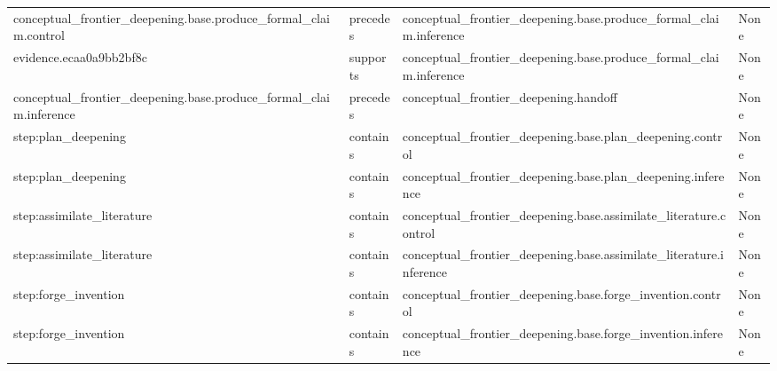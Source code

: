 \documentclass[10pt,a4paper]{article}
\begin{document}
\begin{longtable}{@{}>{\raggedright\arraybackslash}p{.24\linewidth}>{\raggedright\arraybackslash}p{.12\linewidth}>{\raggedright\arraybackslash}p{.24\linewidth}>{\raggedright\arraybackslash}p{.20\linewidth}@{}}
conceptual\allowbreak{}\_\allowbreak{}frontier\_\allowbreak{}deepening.\allowbreak{}base.\allowbreak{}produce\_\allowbreak{}formal\_\allowbreak{}claim.\allowbreak{}control & precedes & conceptual\allowbreak{}\_\allowbreak{}frontier\_\allowbreak{}deepening.\allowbreak{}base.\allowbreak{}produce\_\allowbreak{}formal\_\allowbreak{}claim.\allowbreak{}inference & None\\
evidence.\allowbreak{}ecaa0a9bb2\allowbreak{}bf8c & supports & conceptual\allowbreak{}\_\allowbreak{}frontier\_\allowbreak{}deepening.\allowbreak{}base.\allowbreak{}produce\_\allowbreak{}formal\_\allowbreak{}claim.\allowbreak{}inference & None\\
conceptual\allowbreak{}\_\allowbreak{}frontier\_\allowbreak{}deepening.\allowbreak{}base.\allowbreak{}produce\_\allowbreak{}formal\_\allowbreak{}claim.\allowbreak{}inference & precedes & conceptual\allowbreak{}\_\allowbreak{}frontier\_\allowbreak{}deepening.\allowbreak{}handoff & None\\
step:\allowbreak{}plan\_\allowbreak{}deepening & contains & conceptual\allowbreak{}\_\allowbreak{}frontier\_\allowbreak{}deepening.\allowbreak{}base.\allowbreak{}plan\_\allowbreak{}deepening.\allowbreak{}control & None\\
step:\allowbreak{}plan\_\allowbreak{}deepening & contains & conceptual\allowbreak{}\_\allowbreak{}frontier\_\allowbreak{}deepening.\allowbreak{}base.\allowbreak{}plan\_\allowbreak{}deepening.\allowbreak{}inference & None\\
step:\allowbreak{}assimilate\allowbreak{}\_\allowbreak{}literature\allowbreak{} & contains & conceptual\allowbreak{}\_\allowbreak{}frontier\_\allowbreak{}deepening.\allowbreak{}base.\allowbreak{}assimilate\allowbreak{}\_\allowbreak{}literature\allowbreak{}.\allowbreak{}control & None\\
step:\allowbreak{}assimilate\allowbreak{}\_\allowbreak{}literature\allowbreak{} & contains & conceptual\allowbreak{}\_\allowbreak{}frontier\_\allowbreak{}deepening.\allowbreak{}base.\allowbreak{}assimilate\allowbreak{}\_\allowbreak{}literature\allowbreak{}.\allowbreak{}inference & None\\
step:\allowbreak{}forge\_\allowbreak{}invention & contains & conceptual\allowbreak{}\_\allowbreak{}frontier\_\allowbreak{}deepening.\allowbreak{}base.\allowbreak{}forge\_\allowbreak{}invention.\allowbreak{}control & None\\
step:\allowbreak{}forge\_\allowbreak{}invention & contains & conceptual\allowbreak{}\_\allowbreak{}frontier\_\allowbreak{}deepening.\allowbreak{}base.\allowbreak{}forge\_\allowbreak{}invention.\allowbreak{}inference & None\\

\end{longtable}
\end{document}
